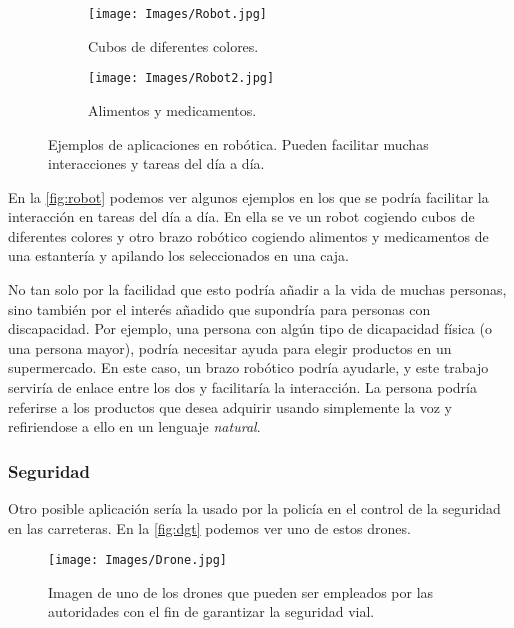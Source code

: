 \begin{figure}[ht]
  \centering
  \begin{subfigure}[b]{.55\textwidth}
    \centering
    \texttt{[image: Images/Robot.jpg]}
    \caption{Cubos de diferentes colores.}
  \end{subfigure}\hfill
  \begin{subfigure}[b]{.4\textwidth}
    \centering
    \texttt{[image: Images/Robot2.jpg]}
    \caption{Alimentos y medicamentos.}
  \end{subfigure}
  \caption[Ejemplos de aplicaciones en robótica]{Ejemplos de aplicaciones en
    robótica. Pueden facilitar muchas interacciones y tareas del día a día.}
  \label{fig:robot}
\end{figure}

En la \vref{fig:robot} podemos ver algunos ejemplos en los que se podría
facilitar la interacción en tareas del día a día. En ella se ve un robot
cogiendo cubos de diferentes colores y otro brazo robótico cogiendo alimentos y
medicamentos de una estantería y apilando los seleccionados en una caja.

No tan solo por la facilidad que esto podría añadir a la vida de muchas
personas, sino también por el interés añadido que supondría para personas con
discapacidad. Por ejemplo, una persona con algún tipo de dicapacidad física (o
una persona mayor), podría necesitar ayuda para elegir productos en un
supermercado. En este caso, un brazo robótico podría ayudarle, y este trabajo
serviría de enlace entre los dos y facilitaría la interacción. La persona
podría referirse a los productos que desea adquirir usando simplemente la voz y
refiriendose a ello en un lenguaje \emph{natural}.

\subsubsection{Seguridad}
Otro posible aplicación sería la usado por la policía en el control de la
seguridad en las carreteras. En la \vref{fig:dgt} podemos ver uno de estos
drones.

\begin{figure}[ht]
  \centering
  \texttt{[image: Images/Drone.jpg]}
  \caption[Drones empleados para la seguridad vial]{Imagen de uno de los drones
    que pueden ser empleados por las autoridades con el fin de garantizar la
    seguridad vial.}
  \label{fig:dgt}
\end{figure}


